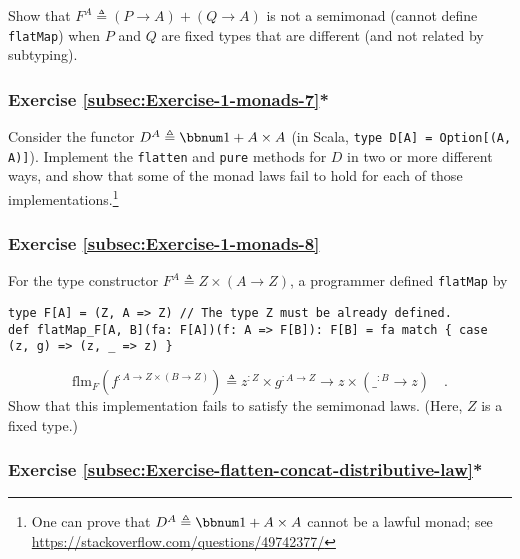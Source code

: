 Show that $F^{A}\triangleq\left(P\rightarrow A\right)+\left(Q\rightarrow A\right)$
is not a semimonad (cannot define \lstinline!flatMap!) when $P$
and $Q$ are fixed types that are different (and not related by subtyping).

\subsubsection{Exercise \label{subsec:Exercise-1-monads-7}\ref{subsec:Exercise-1-monads-7}{*}}

Consider the functor $D^{A}\triangleq\bbnum 1+A\times A$ (in Scala,
\lstinline!type D[A] = Option[(A, A)]!). Implement the \lstinline!flatten!
and \lstinline!pure! methods for $D$ in two or more different ways,
and show that some of the monad laws fail to hold for each of those
implementations.\footnote{One can prove that $D^{A}\triangleq\bbnum 1+A\times A$ cannot be
a lawful monad; see \href{https://stackoverflow.com/questions/49742377/}{https://stackoverflow.com/questions/49742377/}}

\subsubsection{Exercise \label{subsec:Exercise-1-monads-8}\ref{subsec:Exercise-1-monads-8}}

For the type constructor $F^{A}\triangleq Z\times\left(A\rightarrow Z\right)$,
a programmer defined \lstinline!flatMap! by
\begin{lstlisting}
type F[A] = (Z, A => Z) // The type Z must be already defined.
def flatMap_F[A, B](fa: F[A])(f: A => F[B]): F[B] = fa match { case (z, g) => (z, _ => z) }
\end{lstlisting}
\[
\text{flm}_{F}(f^{:A\rightarrow Z\times\left(B\rightarrow Z\right)})\triangleq z^{:Z}\times g^{:A\rightarrow Z}\rightarrow z\times(\_^{:B}\rightarrow z)\quad.
\]
Show that this implementation fails to satisfy the semimonad laws.
(Here, $Z$ is a fixed type.)

\subsubsection{Exercise \label{subsec:Exercise-flatten-concat-distributive-law}\ref{subsec:Exercise-flatten-concat-distributive-law}{*}}

